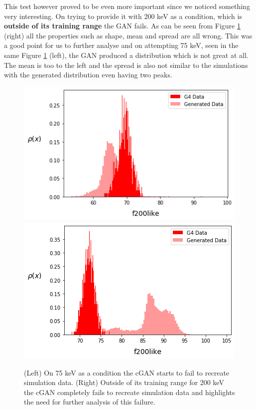 \documentclass[11pt]{article} %
\begin{document}
This test however proved to be even more important since we noticed something very interesting. On trying to provide it with 200 keV as a condition, which is \textbf{outside of its training range} the GAN fails. As can be seen from Figure \ref{fig:1DcGANfailure} (right) all the properties such as shape, mean and spread are all wrong. This was a good point for us to further analyse and on attempting 75 keV, seen in the same Figure \ref{fig:1DcGANfailure} (left), the GAN produced a distribution which is not great at all. The mean is too to the left and the spread is also not similar to the simulations with the generated distribution even having two peaks.
\begin{figure}[H]
\centering
\includegraphics[scale=0.5]{images/1d_conditional_f200_75kev.png}
\includegraphics[scale=0.5]{images/1d_conditional_f200_200kev.png}
\caption{(Left) On 75 keV as a condition the cGAN starts to fail to recreate simulation data. (Right) Outside of its training range for 200 keV the cGAN completely fails to recreate simulation data and highlights the need for further analysis of this failure.}
\label{fig:1DcGANfailure}
\end{figure}
\end{document}
